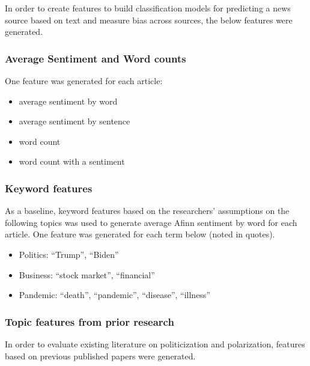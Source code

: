 \documentclass[
]{article}
\providecommand{\tightlist}{%
  \setlength{\itemsep}{0pt}\setlength{\parskip}{0pt}}
\begin{document}
In order to create features to build classification models for
predicting a news source based on text and measure bias across sources,
the below features were generated.

\hypertarget{average-sentiment-and-word-counts}{%
\subsubsection{Average Sentiment and Word
counts}\label{average-sentiment-and-word-counts}}

One feature was generated for each article:

\begin{itemize}
\tightlist
\item
  average sentiment by word
\item
  average sentiment by sentence
\item
  word count
\item
  word count with a sentiment
\end{itemize}

\hypertarget{keyword-features}{%
\subsubsection{Keyword features}\label{keyword-features}}

As a baseline, keyword features based on the researchers' assumptions on
the following topics was used to generate average Afinn sentiment by
word for each article. One feature was generated for each term below
(noted in quotes).

\begin{itemize}
\item
  Politics: ``Trump'', ``Biden''
\item
  Business: ``stock market'', ``financial''
\item
  Pandemic: ``death'', ``pandemic'', ``disease'', ``illness''
\end{itemize}

\hypertarget{topic-features-from-prior-research}{%
\subsubsection{Topic features from prior
research}\label{topic-features-from-prior-research}}

In order to evaluate existing literature on politicization and
polarization, features based on previous published papers were
generated.
\end{document}
